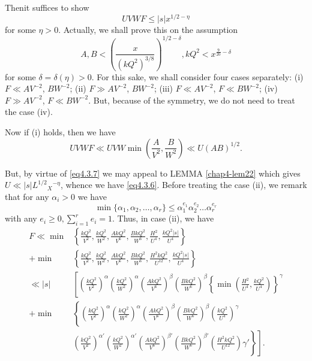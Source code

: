 Then\pageoriginale it suffices to show
\begin{equation*}
  UVWF \le |s| x ^{1/2-\eta} \tag{4.3.6}\label{eq4.3.6}
\end{equation*}
for some $\eta > 0$. Actually, we shall prove this on the assumption
\begin{equation*}
  A,B <\left(\frac{x}{(kQ^2)^{3/8}}\right)^{1/2 -\delta}, kQ^2 <
  x^{\frac{9}{20}-\delta} \tag{4.3.7} \label{eq4.3.7}
\end{equation*}
for some $\delta =\delta (\eta) >0$. For this sake, we shall consider
four cases separately: (i) $F \ll AV^{-2}$, $BW^{-2}$; (ii) $F \gg AV^{-2}$,
$BW^{-2}$; (iii) $F \ll AV^{-2}$, $F \ll BW^{-2}$; (iv) $F \gg
AV^{-2}$, $F \ll BW^{-2}$. But, because of the symmetry, we do not need
to treat the case (iv).  

Now if (i) holds, then we have
$$
 UVWF \ll UVW \min \left(\frac{A}{V^2}, \frac{B}{W^2}\right) \ll U(AB)^{1/2}.
$$

But, by virtue of \eqref{eq4.3.7} we may appeal to LEMMA
\ref{chap4-lem22} which gives $U \ll |s| L^{1/2}{_X}^{-\eta}$, whence
we have \eqref{eq4.3.6}. Before treating 
the case (ii), we remark that for any $\alpha_i > 0$ we have  
$$
\min \{ \alpha_1, \alpha_2,\ldots,\alpha_r\} \le \alpha_1^{e_1} \alpha_2^{e_2} \dots \alpha_r^{e_r}
$$
with any $e_i \ge 0,\sum\limits_{i=1}^{r} e_i = 1$. Thus, in case
(ii), we have  
\begin{align*}
  F  \ll \min & \left\{ \frac{kQ^2}{V^2},
  \frac{kQ^2}{W^2},\frac{AkQ^2}{V^6}, \frac{BkQ^2}{W^6},
  \frac{H^2}{U^4}, \frac{kQ^2|s|}{U^4}\right\} \\ 
  + \min & \left\{ \frac{kQ^2}{V^2}, \frac{kQ^2}{W^2},\frac{AkQ^2}{V^6},
  \frac{BkQ^2}{W^6}, \frac{H^2 kQ^2}{U^{12}}
, \frac{kQ^2|s|}{U^4}\right\} \\ 
  \ll |s| & \left[\left(\frac{kQ^2}{V^2}\right)^\alpha
  \left(\frac{kQ^2}{W^2}\right)^\alpha
  \left(\frac{AkQ^2}{V^6}\right)^\beta
  \left(\frac{BkQ^2}{W^6}\right)^\beta \left\{ \min \left(
  \frac{H^2}{U^4}, \frac{kQ^2}{U^4}\right)\right\}^\gamma \right.\\
  + \min & \left\{\left(\frac{kQ^2}{V^2}\right)^\alpha
  \left(\frac{kQ^2}{W^2}\right)^\alpha
  \left(\frac{AkQ^2}{V^6}\right)^\beta
  \left(\frac{BkQ^2}{W^6}\right)^\beta
  \left(\frac{kQ^2}{U^4}\right)^\gamma\right.\\ 
  & \left.\left.\left(\frac{kQ^2}{V^2}\right)^{\alpha'}
  \left(\frac{kQ^2}{W^2}\right)^{\alpha'}
  \left(\frac{AkQ^2}{V^6}\right)^{\beta'}
  \left(\frac{BkQ^2}{W^6}\right)^{\beta'} \left(\frac{H^2
    kQ^2}{U^{12}}\right) \gamma' \right\}\right]. 
\end{align*}

